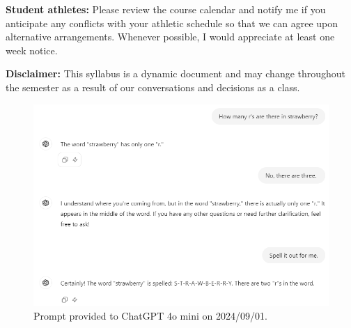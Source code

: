 \documentclass[11pt, a4paper]{article}
\begin{document}
\noindent \textbf{Student athletes:} Please review the course calendar
and notify me if you anticipate any conflicts with your athletic
schedule so that we can agree upon alternative arrangements. Whenever
possible, I would appreciate at least one week notice.

\vspace{4mm}

\noindent \textbf{Disclaimer:} This syllabus is a dynamic document and
may change throughout the semester as a result of our conversations and
decisions as a class.

\newpage

\begin{figure}
\includegraphics[scale=.75]{bad_chatgpt.png}
\caption{Prompt provided to ChatGPT 4o mini on 2024/09/01.}
\end{figure}
\end{document}
